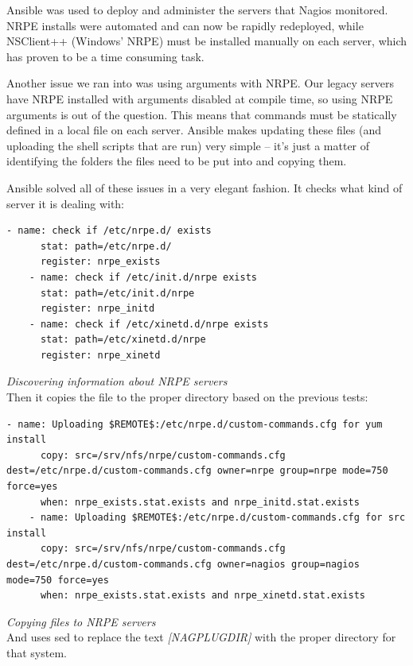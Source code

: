 \documentclass[a4paper]{article}
\begin{document}
Ansible was used to deploy and administer the servers that Nagios monitored. NRPE installs were automated and can now be rapidly redeployed, while NSClient++ (Windows' NRPE) must be installed manually on each server, which has proven to be a time consuming task.

Another issue we ran into was using arguments with NRPE. Our legacy servers have NRPE installed with arguments disabled at compile time, so using NRPE arguments is out of the question. This means that commands must be statically defined in a local file on each server. Ansible makes updating these files (and uploading the shell scripts that are run) very simple -- it's just a matter of identifying the folders the files need to be put into and copying them.

Ansible solved all of these issues in a very elegant fashion. It checks what kind of server it is dealing with:

\begin{lstlisting}[language=nagconf]
    - name: check if /etc/nrpe.d/ exists
      stat: path=/etc/nrpe.d/
      register: nrpe_exists
    - name: check if /etc/init.d/nrpe exists
      stat: path=/etc/init.d/nrpe
      register: nrpe_initd
    - name: check if /etc/xinetd.d/nrpe exists
      stat: path=/etc/xinetd.d/nrpe
      register: nrpe_xinetd
\end{lstlisting}
\hfill \textit{Discovering information about NRPE servers}\\

Then it copies the file to the proper directory based on the previous tests:

\begin{lstlisting}[language=nagconf]
    - name: Uploading $REMOTE$:/etc/nrpe.d/custom-commands.cfg for yum install
      copy: src=/srv/nfs/nrpe/custom-commands.cfg dest=/etc/nrpe.d/custom-commands.cfg owner=nrpe group=nrpe mode=750 force=yes
      when: nrpe_exists.stat.exists and nrpe_initd.stat.exists
    - name: Uploading $REMOTE$:/etc/nrpe.d/custom-commands.cfg for src install
      copy: src=/srv/nfs/nrpe/custom-commands.cfg dest=/etc/nrpe.d/custom-commands.cfg owner=nagios group=nagios mode=750 force=yes
      when: nrpe_exists.stat.exists and nrpe_xinetd.stat.exists
\end{lstlisting}
\hfill \textit{Copying files to NRPE servers}\\

And uses sed to replace the text \textit{[NAGPLUGDIR]} with the proper directory for that system.
\end{document}
